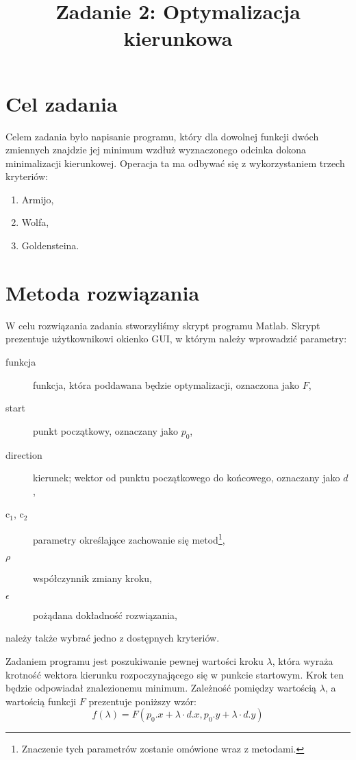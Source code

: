 \documentclass{classrep}
\author{%
  \studentinfo{Michał Janiszewski}{169485} \and
  \studentinfo{Leszek Wach}{xxxxxx}
}
\title{Zadanie 2: Optymalizacja kierunkowa}
\begin{document}
\maketitle

\section{Cel zadania}
Celem zadania było napisanie programu, który dla dowolnej funkcji dwóch zmiennych znajdzie jej minimum wzdłuż wyznaczonego odcinka \ppauza dokona minimalizacji kierunkowej. Operacja ta ma odbywać się z wykorzystaniem trzech kryteriów:
\begin{enumerate}
 \item Armijo,
 \item Wolfa,
 \item Goldensteina.
\end{enumerate}

\section{Metoda rozwiązania}
W celu rozwiązania zadania stworzyliśmy skrypt programu Matlab. Skrypt prezentuje użytkownikowi okienko GUI, w którym należy wprowadzić parametry:
\begin{description}
 \item[funkcja] funkcja, która poddawana będzie optymalizacji, oznaczona jako $F$,
 \item[start] punkt początkowy, oznaczany jako $p_0$,
 \item[direction] kierunek; wektor od punktu początkowego do końcowego, oznaczany jako $d$,
 \item[c$_1$, c$_2$] parametry określające zachowanie się metod\footnote{Znaczenie tych parametrów zostanie omówione wraz z metodami.},
 \item[$\rho$] współczynnik zmiany kroku,
 \item[$\epsilon$] pożądana dokładność rozwiązania,
\end{description}
należy także wybrać jedno z dostępnych kryteriów.

Zadaniem programu jest poszukiwanie pewnej wartości kroku $\lambda$, która wyraża krotność wektora kierunku rozpoczynającego się w punkcie startowym. Krok ten będzie odpowiadał znalezionemu minimum. Zależność pomiędzy wartością $\lambda$, a wartością funkcji $F$ prezentuje poniższy wzór:
\begin{equation}
 f(\lambda) = F(p_0.x + \lambda \cdot d.x, p_0.y + \lambda \cdot d.y)
\end{equation}
\end{document}
